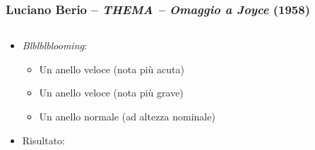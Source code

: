 \begin{frame}
    \frametitle{\normalsize Luciano Berio -- \emph{THEMA -- Omaggio a Joyce} (1958)} 

    \begin{columns}[T]
        \begin{column}{0.7\textwidth}
          \begin{itemize}
              \item \emph{Blblblblooming}:
      
                  \begin{itemize}
                      \item Un anello veloce (nota pi\`u acuta)
                      \item Un anello veloce (nota pi\`u grave)
                      \item Un anello normale (ad altezza nominale)
                  \end{itemize}
      
              \item Risultato: 
      
          \end{itemize}
        \end{column}
        \begin{column}{0.3\textwidth}
        \end{column}
    \end{columns}
        
\end{frame}
